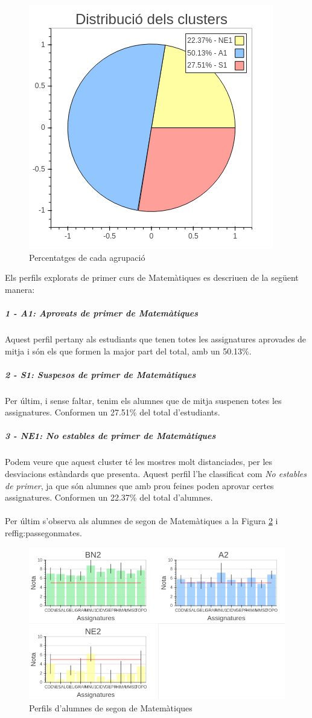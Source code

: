 \documentclass[12pt,a4paper,catalan]{article}
\begin{document}
\begin{figure}[h]
\centering
\includegraphics[width=.4\linewidth]{img/perfils_primer_mates_pastilla.png}
\caption{Percentatges de cada agrupació}
\label{fig:pasprimermates}
\end{figure}

\newpage

Els perfils explorats de primer curs de Matemàtiques es descriuen de la següent manera:

\subparagraph{1 - A1: Aprovats de primer de Matemàtiques}
Aquest perfil pertany als estudiants que tenen totes les assignatures aprovades  de mitja i són els que formen la major part del total, amb un 50.13\%.

\subparagraph{2 - S1: Suspesos de primer de Matemàtiques}
Per últim, i sense faltar, tenim els alumnes que de mitja suspenen totes les assignatures. Conformen un 27.51\% del total d'estudiants.

\subparagraph{3 - NE1: No estables de primer de Matemàtiques}
Podem veure que aquest cluster té les mostres molt distanciades, per les desviacions estàndards que presenta. Aquest perfil l'he classificat com \textit{No estables de primer}, ja que són alumnes que amb prou feines poden aprovar certes assignatures. Conformen un 22.37\% del total d'alumnes.
\\
\\
Per últim s'observa als alumnes de segon de Matemàtiques a la Figura \ref{fig:perfilssegonmates} i ref{fig:passegonmates}.

\begin{figure}[h]
\centering
\includegraphics[width=.85\linewidth]{img/perfils_segon_mates.png}
\caption{Perfils d'alumnes de segon de Matemàtiques}
\label{fig:perfilssegonmates}
\end{figure}
\end{document}
